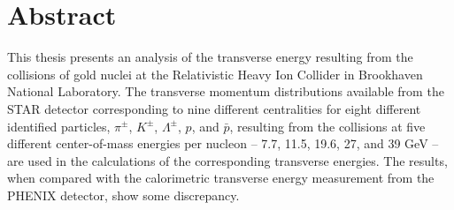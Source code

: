 \chapter*{Abstract}\label{ch:abstract}

This thesis presents an analysis of the transverse energy resulting from the collisions of gold nuclei at the Relativistic Heavy Ion Collider in Brookhaven National Laboratory. The transverse momentum distributions available from the STAR detector corresponding to nine different centralities for eight different identified particles, $\pi^\pm$, $K^\pm$, $\Lambda^\pm$, $p$, and $\bar{p}$, resulting from the collisions at five different center-of-mass energies per nucleon -- 7.7, 11.5, 19.6, 27, and 39 GeV -- are used in the calculations of the corresponding transverse energies. The results, when compared with the calorimetric transverse energy measurement from the PHENIX detector, show some discrepancy.
